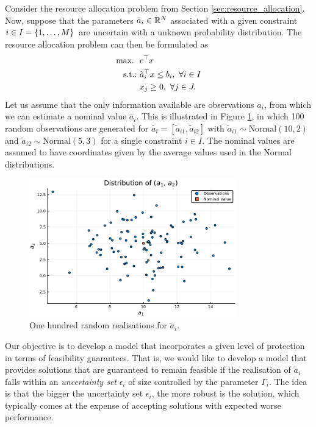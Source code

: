 Consider the resource allocation problem from Section \ref{sec:resource_allocation}. Now, suppose that the parameters $\tilde{a}_i \in \mathbb{R}^N $ associated with a given constraint $i \in I = \left\{ 1,\dots,M \right \}$ are uncertain with a unknown probability distribution. The resource allocation problem can then be formulated as
%
\begin{align*}
	\mathop{\text{max.~}} \ &  c^\top x  \\
	\mathop{\text{s.t.:~}} & \tilde{a}_{i}^\top x \leq b_i, \ \forall i \in I  \\
	& x_j \geq 0, \ \forall j \in J. 
\end{align*} 
%
Let us assume that the only information available are observations $\hat{a}_i$, from which we can estimate a nominal value $\overline{a}_i$. This is illustrated in Figure \ref{fig:random_obsservations}, in which 100 random observations are generated for $\tilde{a_i} = [\tilde{a}_{i1}, \tilde{a}_{i2}]$ with $\tilde{a}_{i1} \sim \text{Normal}(10,2)$ and $\tilde{a}_{i2} \sim \text{Normal}(5,3)$ for a single constraint $i \in I$. The nominal values are assumed to have coordinates given by the average values used in the Normal distributions. 
%
\begin{figure}[h]
	\includegraphics[width=0.8\textwidth]{figures/part_2_chapter_1/data_no_ellipsoid.pdf}
	\caption{One hundred random realisations for $\tilde{a}_i$.} \label{fig:random_obsservations}
\end{figure}
%
Our objective is to develop a model that incorporates a given level of protection in terms of feasibility guarantees. That is, we would like to develop a model that provides solutions that are guaranteed to remain feasible if the realisation of $\tilde{a}_i$ falls within an \emph{uncertainty set} $\epsilon_i$ of size controlled by the parameter $\Gamma_i$. The idea is that the bigger the uncertainty set $\epsilon_i$, the more robust is the solution, which typically comes at the expense of accepting solutions with expected worse performance.

